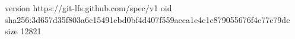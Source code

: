 version https://git-lfs.github.com/spec/v1
oid sha256:3d657d35f803a6c15491ebd0bf4d407f559acca1c4c1c879055676f4c77c79dc
size 12821
